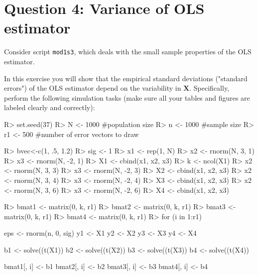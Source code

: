 \documentclass[11pt,reqno]{article}   %
\newcommand{\mlt}[1]{\mathbf{#1}} %
\newcommand{\kX}{\mlt{X}}
\begin{document}
\section*{Question 4: Variance of OLS estimator}
Consider script \texttt{mod1s3}, which deals with the small sample properties of the OLS estimator.

In this exercise you will show that the empirical standard deviations ("standard errors") of the OLS estimator
depend on the variability in $\kX$. Specifically, perform the following simulation tasks
(make sure all your tables and figures are labeled clearly and correctly):

\begin{Schunk}
\begin{Sinput}
R> set.seed(37)
R> N <- 1000 #population size
R> n <- 1000 #sample size
R> r1 <- 500 #number of error vectors to draw
\end{Sinput}
\end{Schunk}

\begin{Schunk}
\begin{Sinput}
R> bvec<-c(1, .5, 1.2)
R> sig <- 1
R> x1 <- rep(1, N)
R> x2 <- rnorm(N, 3, 1)
R> x3 <- rnorm(N, -2, 1)
R> X1 <- cbind(x1, x2, x3)
R> k <- ncol(X1)
R> x2 <- rnorm(N, 3, 3)
R> x3 <- rnorm(N, -2, 3)
R> X2 <- cbind(x1, x2, x3)
R> x2 <- rnorm(N, 3, 4)
R> x3 <- rnorm(N, -2, 4)
R> X3 <- cbind(x1, x2, x3)
R> x2 <- rnorm(N, 3, 6)
R> x3 <- rnorm(N, -2, 6)
R> X4 <- cbind(x1, x2, x3)
\end{Sinput}
\end{Schunk}

\begin{Schunk}
\begin{Sinput}
R> bmat1 <- matrix(0, k, r1)
R> bmat2 <- matrix(0, k, r1)
R> bmat3 <- matrix(0, k, r1)
R> bmat4 <- matrix(0, k, r1)
R> for (i in 1:r1){
         eps <- rnorm(n, 0, sig)
         y1 <- X1 %
         y2 <- X2 %
         y3 <- X3 %
         y4 <- X4 %
         
         b1 <- solve((t(X1)) %
         b2 <- solve((t(X2)) %
         b3 <- solve((t(X3)) %
         b4 <- solve((t(X4)) %
         
         bmat1[, i] <- b1
         bmat2[, i] <- b2
         bmat3[, i] <- b3
         bmat4[, i] <- b4
 }
\end{Sinput}
\end{Schunk}
\end{document}

